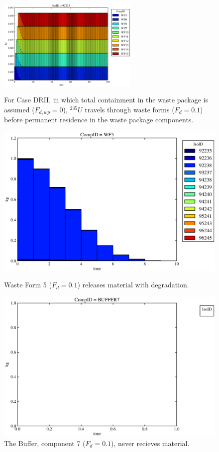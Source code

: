 \begin{figure}[ht]
\centering
\includegraphics[width=0.6\textwidth]{./chapters/demonstration/base/drII.eps}
\caption[$^{235}U$ residence. Degradation Rate Waste Package No Release.]{
For Case DRII, in which total containment in the waste package is assumed ($F_{d,wp}=0$), 
$^{235}U$ travels through waste forms ($F_d = 0.1$) before 
permanent residence in the waste package components.
}
\label{fig:drIIall}
\begin{minipage}[b]{0.45\linewidth}

  \includegraphics[width=\textwidth]{./chapters/demonstration/base/drII1.eps}
  \caption[DRII Waste Form Contaminants.]{
    Waste Form 5 ($F_d = 0.1$) releases material with degradation. 
    }
  \label{fig:drIIwf5}
  
  \includegraphics[width=\textwidth]{./chapters/demonstration/base/drII3.eps}
  \caption[Case DRII Buffer Contaminants]{
    The Buffer, component 7 ($F_d = 0.1$), never recieves material.
    }
  \label{fig:drIIbuff}


\end{minipage}
\end{figure}
